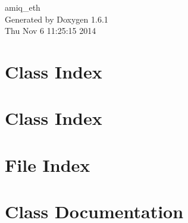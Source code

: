 \documentclass[a4paper]{book}
\begin{document}
\hypersetup{pageanchor=false}
\begin{titlepage}
\vspace*{7cm}
\begin{center}
{\Large amiq\_\-eth }\\
\vspace*{1cm}
{\large Generated by Doxygen 1.6.1}\\
\vspace*{0.5cm}
{\small Thu Nov 6 11:25:15 2014}\\
\end{center}
\end{titlepage}
\clearemptydoublepage
{}
\tableofcontents
\clearemptydoublepage
{}
\hypersetup{pageanchor=true}
\chapter{Class Index}

\chapter{Class Index}

\chapter{File Index}

\chapter{Class Documentation}























\end{document}
